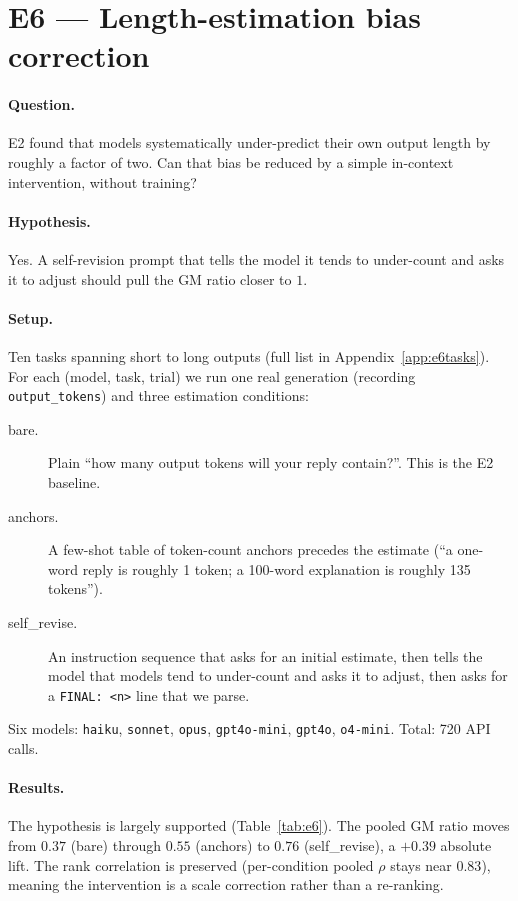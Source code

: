 \documentclass[11pt]{article}
\newcommand{\code}[1]{\texttt{\small #1}}
\begin{document}
\section{E6 --- Length-estimation bias correction}
\label{sec:e6}

\paragraph{Question.} E2 found that models systematically under-predict their own output
length by roughly a factor of two. Can that bias be reduced by a simple in-context
intervention, without training?

\paragraph{Hypothesis.} Yes. A self-revision prompt that tells the model it tends to
under-count and asks it to adjust should pull the GM ratio closer to $1$.

\paragraph{Setup.} Ten tasks spanning short to long outputs (full list in
Appendix~\ref{app:e6tasks}). For each (model, task, trial) we run one real generation
(recording \code{output\_tokens}) and three estimation conditions:

\begin{description}
\item[bare.] Plain ``how many output tokens will your reply contain?''. This is the E2
baseline.
\item[anchors.] A few-shot table of token-count anchors precedes the estimate (``a one-word
reply is roughly 1 token; a 100-word explanation is roughly 135 tokens'').
\item[self\_revise.] An instruction sequence that asks for an initial estimate, then tells the
model that models tend to under-count and asks it to adjust, then asks for a \code{FINAL:
<n>} line that we parse.
\end{description}

Six models: \code{haiku}, \code{sonnet}, \code{opus}, \code{gpt4o-mini}, \code{gpt4o},
\code{o4-mini}. Total: 720 API calls.

\paragraph{Results.} The hypothesis is largely supported (Table~\ref{tab:e6}). The pooled GM
ratio moves from $0.37$ (bare) through $0.55$ (anchors) to $0.76$ (self\_revise), a $+0.39$
absolute lift. The rank correlation is preserved (per-condition pooled $\rho$ stays near
$0.83$), meaning the intervention is a scale correction rather than a re-ranking.
\end{document}

